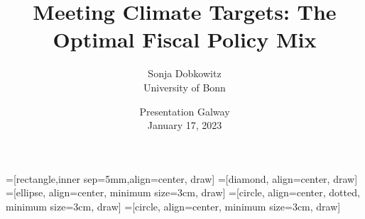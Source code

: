 \documentclass[11pt,aspectratio=169]{beamer}
\author[Sonja Dobkowitz]{\small Sonja Dobkowitz\\ \footnotesize{University of Bonn%
}\\ }
\title{Meeting Climate Targets: The Optimal Fiscal Policy Mix}
\date{\small{ Presentation Galway\\ January 17, 2023 }}
\begin{document}
=[rectangle,inner sep=5mm,align=center, draw]
=[diamond, align=center, draw]
=[ellipse, align=center,  minimum size=3cm, draw]
=[circle, align=center, dotted, minimum size=3cm, draw]
=[circle, align=center, minimum size=3cm, draw]
{
	\begin{frame}
		\titlepage
	\end{frame}
}



\end{document}
